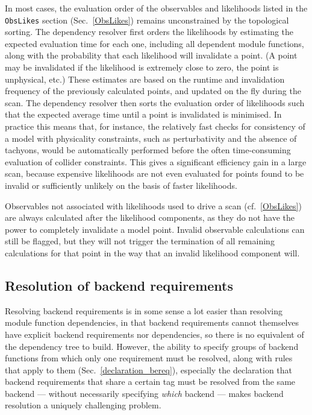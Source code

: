 \documentclass[pdftex,twocolumn,epjc3_preprint,runningheads]{svjour3}
\renewcommand{\_}{\discretionary{\underscore}{}{\underscore}}
\newcommand\yaml[1]{{\lstset{style=yaml}\lstinline!#1!\lstset{style=cpp}}}
\begin{document}
In most cases, the evaluation order of the observables and likelihoods listed in the
\yaml{ObsLikes} section (Sec.~\ref{ObsLikes}) remains unconstrained by the topological
sorting.  The dependency resolver first orders the likelihoods
by estimating the expected evaluation time for each one, including all dependent module functions,
along with the probability that each likelihood will invalidate a point.  (A point may be invalidated if the likelihood is extremely close to zero, the point is unphysical, etc.)  These estimates are based on the
runtime and invalidation frequency of the previously calculated points, and
updated on the fly during the scan.  The dependency resolver then sorts the evaluation order of likelihoods
such that the expected average time until a point is invalidated is
minimised.  In practice this means that, for instance, the relatively fast
checks for consistency of a model with physicality constraints,
such as perturbativity and the absence of tachyons, would be automatically
performed before the often time-consuming evaluation of collider constraints.
This gives a significant efficiency gain in a large scan, because expensive
likelihoods are not even evaluated for points found to be invalid or sufficiently
unlikely on the basis of faster likelihoods.

Observables not associated with likelihoods used to drive a scan (cf.\ \ref{ObsLikes}) are always calculated after the likelihood components, as they do not have the power to completely invalidate a model point.  Invalid observable calculations can still be flagged, but they will not trigger the termination of all remaining calculations for that point in the way that an invalid likelihood component will.


\subsection{Resolution of backend requirements}

Resolving backend requirements is in some sense a lot easier than resolving module function dependencies, in that backend requirements cannot themselves have explicit backend requirements nor dependencies, so there is no equivalent of the dependency tree to build.  However, the ability to specify groups of backend functions from which only one requirement must be resolved, along with rules that apply to them (Sec.\ \ref{declaration_bereq}), especially the declaration that backend requirements that share a certain tag must be resolved from the same backend --- without necessarily specifying \textit{which} backend --- makes backend resolution a uniquely challenging problem.
\end{document}
